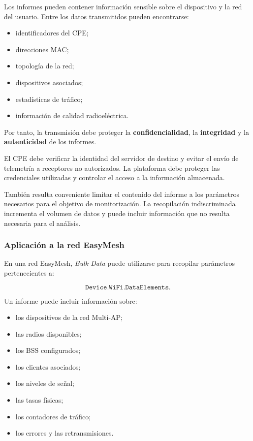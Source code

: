 Los informes pueden contener información sensible sobre el dispositivo y
la red del usuario. Entre los datos transmitidos pueden encontrarse:

\begin{itemize}
    \item identificadores del CPE;
    \item direcciones MAC;
    \item topología de la red;
    \item dispositivos asociados;
    \item estadísticas de tráfico;
    \item información de calidad radioeléctrica.
\end{itemize}

Por tanto, la transmisión debe proteger la
\textbf{confidencialidad}, la \textbf{integridad} y la
\textbf{autenticidad} de los informes.

El CPE debe verificar la identidad del servidor de destino y evitar el
envío de telemetría a receptores no autorizados. La plataforma debe
proteger las credenciales utilizadas y controlar el acceso a la
información almacenada.

También resulta conveniente limitar el contenido del informe a los
parámetros necesarios para el objetivo de monitorización. La recopilación
indiscriminada incrementa el volumen de datos y puede incluir información
que no resulta necesaria para el análisis.


\subsubsection*{Aplicación a la red EasyMesh}

En una red EasyMesh, \textit{Bulk Data} puede utilizarse para recopilar
parámetros pertenecientes a:

\[
    \texttt{Device.WiFi.DataElements.}
\]

Un informe puede incluir información sobre:

\begin{itemize}
    \item los dispositivos de la red Multi-AP;
    \item las radios disponibles;
    \item los BSS configurados;
    \item los clientes asociados;
    \item los niveles de señal;
    \item las tasas físicas;
    \item los contadores de tráfico;
    \item los errores y las retransmisiones.
\end{itemize}

